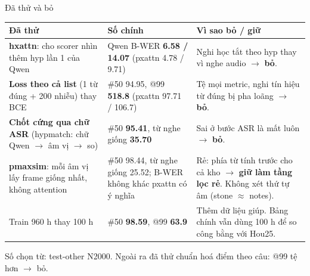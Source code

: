 \documentclass[aspectratio=169,xcolor=table]{beamer}
\newcommand{\bad}[1]{\textcolor{RiskRed}{\textbf{#1}}}
\newcommand{\good}[1]{\textcolor{GoodGreen}{\textbf{#1}}}
\newcommand{\ra}{$\rightarrow$}
\begin{document}
\begin{frame}{Đã thử và bỏ}
\centering\scriptsize\setlength{\tabcolsep}{3pt}
\begin{tabular}{L{3.6cm}L{4.6cm}L{5.6cm}}
\toprule
Đã thử & Số chính & Vì sao bỏ / giữ\\
\midrule
\textbf{hxattn}: cho scorer nhìn thêm hyp lần 1 của Qwen & Qwen B-WER \bad{6.58 / 14.07} (pxattn 4.78 / 9.71) & Nghi học tắt theo hyp thay vì nghe audio \ra{} \textbf{bỏ}.\\
\addlinespace
\textbf{Loss theo cả list} (1 từ đúng + 200 nhiễu) thay BCE & \#50 94.95, @99 \bad{518.8} (pxattn 97.71 / 106.7) & Tệ mọi metric, nghi tín hiệu từ đúng bị pha loãng \ra{} \textbf{bỏ}.\\
\addlinespace
\textbf{Chốt cứng qua chữ ASR} (hypmatch: chữ Qwen \ra{} âm vị \ra{} so) & \#50 \bad{95.41}, từ nghe giống \bad{35.70} & Sai ở bước ASR là mất luôn \ra{} \textbf{bỏ}.\\
\addlinespace
\textbf{pmaxsim}: mỗi âm vị lấy frame giống nhất, không attention & \#50 98.44, từ nghe giống 25.52; B-WER không khác pxattn có ý nghĩa & Rẻ: phía từ tính trước cho cả kho \ra{} \textbf{giữ làm tầng lọc rẻ}. Không xét thứ tự âm (stone $\approx$ notes).\\
\addlinespace
Train 960 h thay 100 h & \#50 \good{98.59}, @99 \good{63.9} & Thêm dữ liệu giúp. Bảng chính vẫn dùng 100 h để so công bằng với Hou25.\\
\bottomrule
\end{tabular}\par
\vspace{0.1cm}\raggedright
{\scriptsize\color{TextGray} Số chọn từ: test-other N2000. Ngoài ra đã thử chuẩn hoá điểm theo câu: @99 tệ hơn \ra{} bỏ.}
\end{frame}
\end{document}
